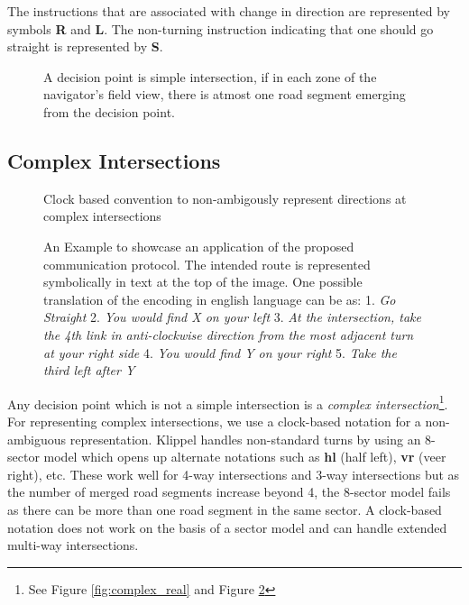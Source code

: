 \documentclass{iitkthesis}
\begin{document}
The instructions that are associated with change in direction are 
represented by symbols \textbf{R} and \textbf{L}. The non-turning 
instruction indicating that one should go straight is represented by {\bf S}. 

\begin{figure}
\centering
\caption{A decision point is simple intersection, if in each zone of the navigator's field view, there is atmost one road segment emerging from the decision point.}
\label{fig:simpleturns}
 \end{figure}
\subsection{Complex Intersections}
\begin{figure}
\centering
\caption{Clock based convention to non-ambigously represent directions at complex intersections}
\label{fig:complex}
 \end{figure}
\begin{figure}
\centering
\caption{An Example to showcase an application of the proposed 
communication protocol. The intended route is represented symbolically in 
text at the top of the image. One possible translation of the encoding in 
english language can be as: 
1. \textit{Go Straight}
2. \textit{You would find X on your left}
3. \textit{At the intersection, take the 4th link in anti-clockwise direction from the most adjacent turn at your right side} 
4. \textit{You would find Y on your right}
5. \textit{Take the third left after Y}
}
\label{fig:complexex}
 \end{figure} 
Any decision point which is not a simple intersection is a 
\textit{complex intersection}\footnote{See Figure \ref{fig:complex_real} 
and Figure \ref{fig:complex}}. For representing complex intersections, we 
use a clock-based notation for a non-ambiguous representation. Klippel 
\cite{klippel} handles non-standard turns by using an 8-sector model which 
opens up alternate notations such as \textbf{hl} (half left), 
\textbf{vr} (veer right), etc. These work well for 4-way intersections 
and 3-way intersections but as the number of merged road segments 
increase beyond 4, the 8-sector model fails as there can be more than one 
road segment in the same sector. A clock-based notation does not work on the 
basis of a sector model and can handle extended multi-way intersections.
\end{document}
